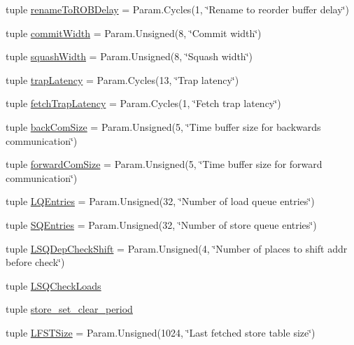 \begin{DoxyCompactItemize}
\item 
tuple \hyperlink{classO3CPU_1_1DerivO3CPU_a1c17c9a7d634b03c7c2b7c0ba0ca21b9}{renameToROBDelay} = Param.Cycles(1, \char`\"{}Rename to reorder buffer delay\char`\"{})
\item 
tuple \hyperlink{classO3CPU_1_1DerivO3CPU_a3df421018d58bcd7f02c3965f6b43ac3}{commitWidth} = Param.Unsigned(8, \char`\"{}Commit width\char`\"{})
\item 
tuple \hyperlink{classO3CPU_1_1DerivO3CPU_a822a947e7bb7034547d91ec80d337303}{squashWidth} = Param.Unsigned(8, \char`\"{}Squash width\char`\"{})
\item 
tuple \hyperlink{classO3CPU_1_1DerivO3CPU_a2c19f8ca9c4486b056283762263259bd}{trapLatency} = Param.Cycles(13, \char`\"{}Trap latency\char`\"{})
\item 
tuple \hyperlink{classO3CPU_1_1DerivO3CPU_a900fa0c4fce6b3d76add508093ce4fee}{fetchTrapLatency} = Param.Cycles(1, \char`\"{}Fetch trap latency\char`\"{})
\item 
tuple \hyperlink{classO3CPU_1_1DerivO3CPU_a6fb79a7e84aed7aa969c44543052ac34}{backComSize} = Param.Unsigned(5, \char`\"{}Time buffer size for backwards communication\char`\"{})
\item 
tuple \hyperlink{classO3CPU_1_1DerivO3CPU_a0e528cb0724c691b5eaca85ad02144d8}{forwardComSize} = Param.Unsigned(5, \char`\"{}Time buffer size for forward communication\char`\"{})
\item 
tuple \hyperlink{classO3CPU_1_1DerivO3CPU_ae14ed73e842c3580d021c73c0e2b5aaf}{LQEntries} = Param.Unsigned(32, \char`\"{}Number of load queue entries\char`\"{})
\item 
tuple \hyperlink{classO3CPU_1_1DerivO3CPU_a910857438278a89a287832cf7087317b}{SQEntries} = Param.Unsigned(32, \char`\"{}Number of store queue entries\char`\"{})
\item 
tuple \hyperlink{classO3CPU_1_1DerivO3CPU_a1b3d69c0417f81ea9f80c896fe699060}{LSQDepCheckShift} = Param.Unsigned(4, \char`\"{}Number of places to shift addr before check\char`\"{})
\item 
tuple \hyperlink{classO3CPU_1_1DerivO3CPU_a3859ad14dd72838e8cd3c5586a575f39}{LSQCheckLoads}
\item 
tuple \hyperlink{classO3CPU_1_1DerivO3CPU_aa49311e8ec513d42fb69e219d3deb35f}{store\_\-set\_\-clear\_\-period}
\item 
tuple \hyperlink{classO3CPU_1_1DerivO3CPU_ae8cdf1f1e20a08d0b3200297a9da7d60}{LFSTSize} = Param.Unsigned(1024, \char`\"{}Last fetched store table size\char`\"{})
\item 

\end{DoxyCompactItemize}
